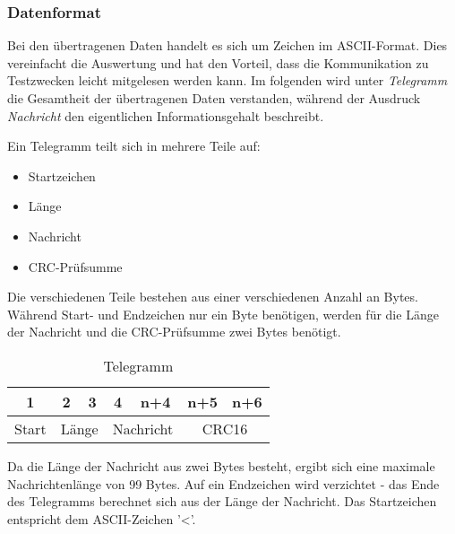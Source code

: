 \newpage

\subsubsection{Datenformat}
\label{subsub: Datenformat}

Bei den übertragenen Daten handelt es sich um Zeichen im \acs{ASCII}-Format. Dies vereinfacht die Auswertung und hat den Vorteil, dass die Kommunikation
zu Testzwecken leicht mitgelesen werden kann. Im folgenden wird unter \textit{Telegramm} die Gesamtheit der übertragenen Daten verstanden, während 
der Ausdruck \textit{Nachricht} den eigentlichen Informationsgehalt beschreibt.

\smallskip

Ein Telegramm teilt sich in mehrere Teile auf:

\begin{itemize}
    \item Startzeichen
    \item Länge
    \item Nachricht
    \item CRC-Prüfsumme
\end{itemize}



Die verschiedenen Teile bestehen aus einer verschiedenen Anzahl an Bytes. Während Start- und Endzeichen nur ein Byte benötigen, werden für die
Länge der Nachricht und die CRC-Prüfsumme zwei Bytes benötigt.

\smallskip

\begin{wraptable}{r}{75mm} 
    
    \begin{tabular}{ |c | c | c | c | c | c | c | }
        \hline
        1 & 2 & 3 & 4 & n+4 & n+5 & n+6  \\
        \hline \hline
        Start  & \multicolumn{2}{|c|}{Länge} & \multicolumn{2}{|c|}{Nachricht} & \multicolumn{2}{|c|}{CRC16} \\
        \hline
    
      \end{tabular}
    \centering
    \caption{Telegramm}
    \end{wraptable}


Da die Länge der Nachricht aus zwei Bytes besteht, ergibt sich eine maximale Nachrichtenlänge von 99 Bytes. Auf ein Endzeichen wird verzichtet - 
das Ende des Telegramms berechnet sich aus der Länge der Nachricht. Das Startzeichen entspricht dem \acs{ASCII}-Zeichen '<'.

